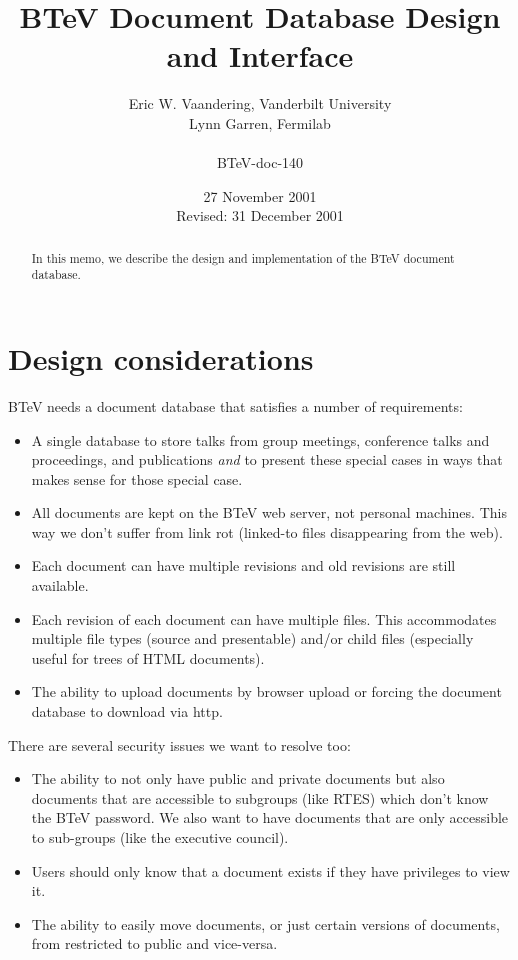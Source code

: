 \documentclass[12pt]{article}
\begin{document}
                                                 

\title{BTeV Document Database Design and Interface}

\author{
        Eric W. Vaandering, Vanderbilt University\\
        Lynn Garren, Fermilab\\
        \\
        {BTeV-doc-140}
       }
        

\date{27 November 2001 \\
      Revised: 31 December 2001}

\maketitle

\begin{abstract} 
In this memo, we describe the design and implementation of the BTeV document
database.
\end{abstract}

\section{Design considerations}

BTeV needs a document database that satisfies a number of requirements:
\begin{itemize}
\item{A single database to store talks from group meetings,
conference talks and proceedings, and publications \emph{and} to present these
special cases in ways that makes sense for those special case.}
\item{All documents are kept on the BTeV web server, not personal machines. 
This way we don't suffer from link rot (linked-to files disappearing from the web).}
\item{Each document can have multiple revisions and old revisions are still
available.}
\item{Each revision of each document can have multiple files. This accommodates
multiple file types (source and  presentable) and/or child files (especially
useful for trees of HTML  documents).}
\item{The ability to upload documents by browser upload or forcing the 
document database to download via http.}
\end{itemize}

There are several security issues we want to resolve too:
\begin{itemize}
\item{The ability to not only have public and private documents but also 
documents that are accessible to subgroups (like RTES) which don't know 
the BTeV password. We also want to have documents that are only 
accessible to sub-groups (like the executive council).}
\item{Users should only know that a document exists if they have 
privileges to view it.}
\item{The ability to easily move documents, or just certain versions of 
documents, from restricted to public and vice-versa.}
\end{itemize}
\end{document}
